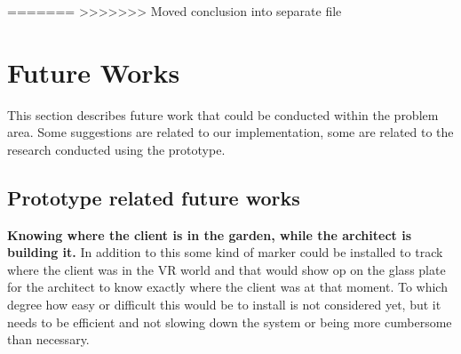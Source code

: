 =======
>>>>>>> Moved conclusion into separate file




\chapter{Future Works}
This section describes future work that could be conducted within the problem area. Some suggestions are related to our implementation, some are related to the research conducted using the prototype.
\section{Prototype related future works}
\textbf{Knowing where the client is in the garden, while the architect is building it.} In addition to this some kind of marker could be installed to track where the client was in the VR world and that would show op on the glass plate for the architect to know exactly where the client was at that moment. To which degree how easy or difficult this would be to install is not considered yet, but it needs to be efficient and not slowing down the system or being more cumbersome than necessary.\\

